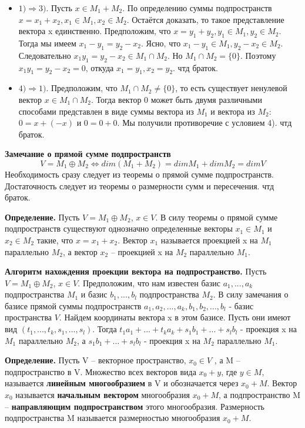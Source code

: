 \documentclass[a4paper]{article}
\begin{document}
\begin{itemize}
\item $1) \Rightarrow 3)$. Пусть $x \in M_1 + M_2$. По определению суммы подпространств $x = x_1 + x_2, x_1 \in M_1, x_2 \in M_2$. Остаётся доказать, то такое представление вектора x единственно. Предположим, что $x = y_1 + y_2, y_1 \in M_1, y_2 \in M_2$. Тогда мы имеем $x_1-y_1 = y_2 - x_2$. Ясно, что $x_1 - y_1 \in M_1, y_2-x_2 \in M_2$. Следовательно $x_1y_1 = y_2 - x_2 \in M_1 \cap M_2$.
Но $M_1 \cap M_2 = \{ 0 \}$. Поэтому $x_1y_1 = y_2 - x_2 = 0$, откуда $x_1 = y_1, x_2 = y_2$. чтд браток.

\item $4) \Rightarrow 1)$. Предположим, что $M_1 \cap M_2 \neq \{ 0 \}$, то есть существует ненулевой вектор $x \in M_1 \cap M_2$. Тогда вектор 0 может быть двумя различными способами представлен в виде суммы вектора из $M_1$ и вектора из $M_2$: $0 = x+(-x)$ и $0 = 0+0$. Мы получили противоречие с условием 4). чтд браток.
\end{itemize}

\textbf{Замечание о прямой сумме подпространств} \begin{equation}
V = M_1 \oplus M_2 \Leftrightarrow dim(M_1 + M_2) = dim M_1 + dim M_2 = dim V
\end{equation}
Необходимость сразу следует из теоремы о прямой сумме подпространств.
Достаточность следует из теоремы о размерности сумм и пересечения. чтд браток.

\textbf{Определение.}  Пусть $V = M_1 \oplus M_2$, $x \in V$. В силу теоремы о прямой сумме подпространств существуют однозначно определенные векторы $x_1 \in M_1$ и
$x_2 \in M_2$ такие, что $x = x_1 + x_2$. Вектор $x_1$ называется проекцией x на $M_1$
параллельно $M_2$, а вектор $x_2$ – проекцией x на $M_2$ параллельно $M_1$.
 


\textbf{Алгоритм нахождения проекции вектора на подпространство.} Пусть $V = M_1 \oplus M_2$, $x \in V$. Предположим, что нам известен базис $a_1, ..., a_k$ подпространства $M_1$ и базис $b_1, ..., b_l$ подпространства $M_2$. В силу замечания о базисе прямой суммы подпространств $a_1, a_2, ..., a_k, b_1, b_2, ... ,b_l$ - базис пространства $V$. Найдем координаты вектора x в этом базисе. Пусть они имеют вид $(t_1, ..., t_k, s_1, ..., s_l)$. Тогда $t_1a_1 + ... + t_ka_k + s_1b_1 + ... + s_lb_l$ - проекция x на $M_1$ параллельно $M_2$, а $s_1b_1 + ... + s_lb_l$ - проекция x на $M_2$ параллельно $M_1$.


\textbf{Определение.} Пусть V – векторное пространство, $x_0 \in V$ , а M – подпространство в V.
Множество всех векторов вида $x_0 + y$, где $y \in M$, называется \textbf{линейным
многообразием} в V и обозначается через $x_0 + M$. Вектор $x_0$ называется
\textbf{начальным вектором }многообразия $x_0 + M$, а подпространство M –
\textbf{направляющим подпространством} этого многообразия. Размерность
подпространства M называется размерностью многообразия $x_0 + M$.
\end{document}
